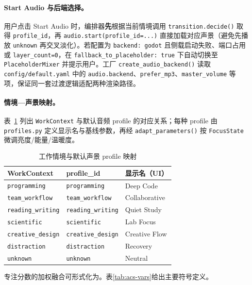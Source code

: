 \documentclass[12pt, fontset=windows]{ctexart}
\begin{document}
\paragraph{Start Audio 与后端选择。}用户点击 Start Audio 时，编排器\textbf{先}根据当前情境调用 \texttt{transition.decide()} 取得 \texttt{profile\_id}，再 \texttt{audio.start(profile\_id=...)} 直接加载对应声景（避免先播放 \texttt{unknown} 再交叉淡化）。若配置为 \texttt{backend: godot} 且侧载启动失败、端口占用或 \texttt{layer\_count=0}，在 \texttt{fallback\_to\_placeholder: true} 下自动切换至 \texttt{PlaceholderMixer} 并提示用户。工厂 \texttt{create\_audio\_backend()} 读取 \texttt{config/default.yaml} 中的 \texttt{audio.backend}、\texttt{prefer\_mp3}、\texttt{master\_volume} 等项，保证同一套过渡逻辑适配两种渲染路径。

\paragraph{情境—声景映射。}表~\ref{tab:context-profile} 列出 \texttt{WorkContext} 与默认音频 profile 的对应关系；每种 profile 由 \texttt{profiles.py} 定义显示名与基线参数，再经 \texttt{adapt\_parameters()} 按 \texttt{FocusState} 微调亮度/能量/温暖度。

\begin{table}[H]
\centering
\caption{工作情境与默认声景 profile 映射}
\label{tab:context-profile}
\small
\begin{tabular}{@{}lll@{}}
\toprule
\textbf{WorkContext} & \textbf{profile\_id} & \textbf{显示名（UI）} \\
\midrule
\texttt{programming} & \texttt{programming} & Deep Code \\
\texttt{team\_workflow} & \texttt{team\_workflow} & Collaborative \\
\texttt{reading\_writing} & \texttt{reading\_writing} & Quiet Study \\
\texttt{scientific} & \texttt{scientific} & Lab Focus \\
\texttt{creative\_design} & \texttt{creative\_design} & Creative Flow \\
\texttt{distraction} & \texttt{distraction} & Recovery \\
\texttt{unknown} & \texttt{unknown} & Neutral \\
\bottomrule
\end{tabular}
\end{table}

专注分数的加权融合可形式化为。表\ref{tab:acs-vars}给出主要符号定义。
\end{document}
